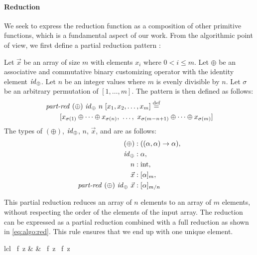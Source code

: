 \paragraph{Reduction}
We seek to express the reduction function as a composition of other primitive functions, which is a fundamental aspect of our work.
From the algorithmic point of view, we first define a partial reduction pattern \partRed:
\begin{definition}
  \label{definition:pattern:parReduce}
  Let $\vec{x}$ be an array of size $m$ with elements $x_i$ where $0 < i \leq m$.
  Let $\oplus$ be an associative and commutative binary customizing operator with the identity element $\text{\textit{id}}_\oplus$.
  Let $n$ be an integer values where $m$ is evenly divisible by $n$.
  Let $\sigma$ be an arbitrary permutation of $[1,\ldots, m]$.
  The \partRed pattern is then defined as follows:
  \begin{align*}
    &\text{\textit{part-red}}\ (\oplus)\ \text{\textit{id}}_\oplus\ n\ [x_1, x_2, \dots, x_m] \stackrel{\textrm{\scriptsize def}}{=}\\
    &\qquad [x_{\sigma(1)} \oplus \dots \oplus x_{\sigma(n)},\ \dots ,\ x_{\sigma(m-n+1)} \oplus \dots \oplus x_{\sigma(m)}]
  \end{align*}
  The types of $(\oplus)$, $\text{\textit{id}}_\oplus$, $n$, $\vec{x}$, and \partRed are as follows:
  \begin{align*}
    (\oplus) &: ((\alpha, \alpha) \rightarrow \alpha),\\
    \text{\textit{id}}_\oplus &: \alpha,\\
    n &: \text{int},\\
    \vec{x} &: [\alpha]_m,\\
    \text{\textit{part-red}}\ (\oplus)\ \text{\textit{id}}_\oplus\ \vec{x} &: [\alpha]_{m/n}
  \end{align*}
\end{definition}
\noindent
This partial reduction reduces an array of $n$ elements to an array of $m$ elements, without respecting the order of the elements of the input array.
The reduction can be expressed as a partial reduction combined with a full reduction as shown in \autoref{eq:algo:red}.
This rule ensures that we end up with one unique element.
%
\begin{rerule}{lcl}
  \reduce\ f\ z
    & \rightarrow &
      \reduce\ f\ z \circ \partRed\ f\ z
  \label{eq:algo:red}
\end{rerule}

